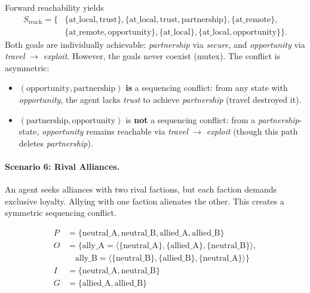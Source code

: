 Forward reachability yields
\begin{align*}
  S_{\text{reach}} = \{ & \{\text{at\_local}, \text{trust}\}, \{\text{at\_local}, \text{trust}, \text{partnership}\}, \{\text{at\_remote}\}, \\
                       & \{\text{at\_remote}, \text{opportunity}\}, \{\text{at\_local}\}, \{\text{at\_local}, \text{opportunity}\}\}.
\end{align*}
Both goals are individually achievable: \textit{partnership} via \textit{secure}, and \textit{opportunity} via \textit{travel} $\rightarrow$ \textit{exploit}. However, the goals never coexist (mutex). The conflict is asymmetric:
\begin{itemize}
  \item $(\text{opportunity}, \text{partnership})$ \textbf{is} a sequencing conflict: from any state with \textit{opportunity}, the agent lacks \textit{trust} to achieve \textit{partnership} (travel destroyed it).
  \item $(\text{partnership}, \text{opportunity})$ is \textbf{not} a sequencing conflict: from a \textit{partnership}-state, \textit{opportunity} remains reachable via \textit{travel} $\rightarrow$ \textit{exploit} (though this path de\-letes \textit{partnership}).
\end{itemize}

\paragraph{Scenario 6: Rival Alliances.}

An agent seeks alliances with two rival factions, but each faction demands exclusive loyalty. Allying with one faction alienates the other. This creates a symmetric sequencing conflict.

\begin{align*}
  P & = \{\text{neutral\_A}, \text{neutral\_B}, \text{allied\_A}, \text{allied\_B}\}                               \\
  O & = \{ \text{ally\_A} = \langle \{\text{neutral\_A}\}, \{\text{allied\_A}\}, \{\text{neutral\_B}\} \rangle,    \\
    & \quad \text{ally\_B} = \langle \{\text{neutral\_B}\}, \{\text{allied\_B}\}, \{\text{neutral\_A}\} \rangle \} \\
  I & = \{\text{neutral\_A}, \text{neutral\_B}\}                                                                   \\
  G & = \{\text{allied\_A}, \text{allied\_B}\}
\end{align*}

